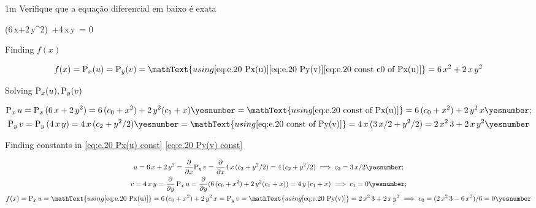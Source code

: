 \documentclass["AM3C-Slides_annotations.tex"]{subfiles}
\begin{document}
\begin{exampleBox}1m{} %
  Verifique que a equação diferencial em baixo é exata
  \begin{BM}
    (6\,x+2\,y^2)\,
    +4\,x\,y\, = 0
  \end{BM}

  \answer{}

  Finding \(f(x)\)
  \begin{tcolorbox}
    \begin{gather*}
      f(x)
      = \prim_x(u)
      = \prim_y(v)
      = \mathText{using 
        \eqref{eq:e.20 Px(u)}
        \eqref{eq:e.20 Py(v)}
        \eqref{eq:e.20 const c0 of Px(u)}
      }
      = 6\,x^2
      + 2\,x\,y^2
    \end{gather*}
  \end{tcolorbox}

  Solving \(\operatorname{\mathrm{P}}_x(u),\operatorname{\mathrm{P}}_y(v)\)
  \begin{tcolorbox}
    \begin{gather*}
      \prim_x{u}
      = \prim_x{(
          6\,x+2\,y^2
      )}
      = 6\,(c_0+x^2)
      + 2\,y^2(c_1+x)
      \yesnumber\label{eq:e.20 Px(u) const}
      = \mathText{using \eqref{eq:e.20 const of Px(u)}}
      = 6\,(c_0+x^2)
      + 2\,y^2\,x
      \yesnumber\label{eq:e.20 Px(u)}
      ; \\
      \prim_y{v}
      = \prim_y{(
          4\,x\,y
      )}
      = 4\,x\,(c_2+y^2/2)
      \yesnumber\label{eq:e.20 Py(v) const}
      = \mathText{using \eqref{eq:e.20 const of Py(v)}}
      = 4\,x\,(3\,x/2+y^2/2)
      = 2\,x^2\,3
      + 2\,x\,y^2
      \yesnumber\label{eq:e.20 Py(v)}
    \end{gather*}
  \end{tcolorbox}

  Finding constants in
  \eqref{eq:e.20 Px(u) const}
  \eqref{eq:e.20 Py(v) const}
  \begin{tcolorbox}
    \begin{gather*}
      u
      = 6\,x+2\,y^2
      = \pdv{}{x}{
        \prim_y{v}
      }
      = \pdv{}{x}{
        4\,x\,(c_2+y^2/2)
      }
      = 4\,(c_2+y^2/2)
      \implies
      c_2 = 3\,x/2
      \yesnumber\label{eq:e.20 const of Py(v)}
      ; \\
      v
      = 4\,x\,y
      = \pdv{}{y}\prim_x{u}   
      = \pdv{}{y}{(
          6\,(c_0+x^2)
          + 2\,y^2(c_1+x)
      )}
      = 4\,y\,(c_1+x)
      \implies c_1 = 0
      \yesnumber\label{eq:e.20 const of Px(u)}
      ; \\
      f(x)
      = \prim_x{u}
      = \mathText{using \eqref{eq:e.20 Px(u)}}
      = 6\,(c_0+x^2)
      + 2\,y^2\,x
      = \prim_y{v}
      = \mathText{using \eqref{eq:e.20 Py(v)}}
      = 2\,x^2\,3
      + 2\,x\,y^2
      \implies
      c_0
      = (
        2\,x^2\,3
        - 6\,x^2
      )/6
      = 0
      \yesnumber\label{eq:e.20 const c0 of Px(u)}
    \end{gather*}
  \end{tcolorbox}

\end{exampleBox}
\end{document}
